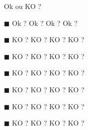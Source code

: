 \documentclass{../main/main}
\begin{document}
\begin{tdoccaut}
    Ok ou KO ?
\end{tdoccaut}

\vspace{20.9cm}

\begin{tdocnote}
    $\blacksquare$ Ok ? Ok ? Ok ? Ok ?

    $\blacksquare$
    KO ? KO ? KO ? KO ?

    $\blacksquare$
    KO ? KO ? KO ? KO ?

    $\blacksquare$
    KO ? KO ? KO ? KO ?

    $\blacksquare$
    KO ? KO ? KO ? KO ?

    $\blacksquare$
    KO ? KO ? KO ? KO ?

    $\blacksquare$
    KO ? KO ? KO ? KO ?
\end{tdocnote}
\end{document}
